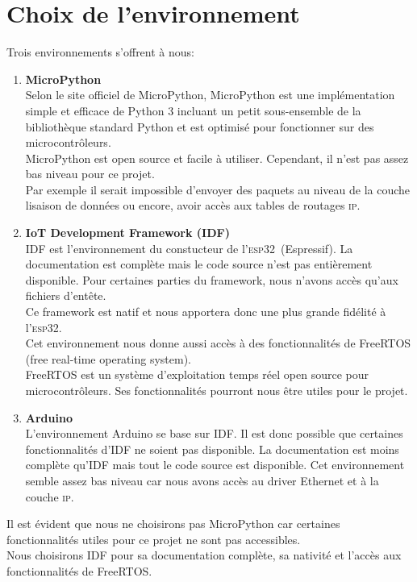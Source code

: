 \documentclass[a4paper, 12pt]{report}
\newcommand{\esp}{\textsc{esp32}}
\begin{document}
\section{Choix de l'environnement}
    Trois environnements s'offrent à nous:
    \begin{enumerate}
        \item \textbf{MicroPython}\\
            Selon le site officiel de MicroPython\cite{micropython_w}, MicroPython est une implémentation simple et efficace de Python 3
            incluant un petit sous-ensemble de la bibliothèque standard Python et est optimisé pour fonctionner sur des microcontrôleurs.\\
            MicroPython est open source et facile à utiliser. Cependant, il n'est pas assez bas niveau pour ce projet.\\
            Par exemple il serait impossible d'envoyer des paquets au niveau de la couche lisaison de données ou encore, avoir accès aux tables de routages \textsc{ip}.\\
        
        \item \textbf{IoT Development Framework (IDF)}\\
            IDF est l'environnement du constucteur de l'\esp\ (Espressif). La documentation est complète mais le code source n'est pas entièrement disponible. Pour certaines
            parties du framework, nous n'avons accès qu'aux fichiers d'entête.\\
            Ce framework est natif et nous apportera donc une plus grande fidélité à l'\esp. \\
            Cet environnement nous donne aussi accès à des fonctionnalités de FreeRTOS (free real-time operating system).\\
            FreeRTOS est un système d'exploitation temps réel open source pour microcontrôleurs. Ses fonctionnalités pourront nous être utiles pour le projet.\\

        \item \textbf{Arduino}\\
            L'environnement Arduino se base sur IDF. Il est donc possible que certaines fonctionnalités d'IDF ne soient pas disponible. 
            La documentation est moins complète qu'IDF mais tout le code source est disponible. Cet environnement semble assez bas
            niveau car nous avons accès au driver Ethernet et à la couche \textsc{ip}.
    \end{enumerate}
    \vspace{1cm}
    Il est évident que nous ne choisirons pas MicroPython car certaines fonctionnalités utiles pour ce projet ne sont pas accessibles.\\
    Nous choisirons IDF pour sa documentation complète, sa nativité et l'accès aux fonctionnalités de FreeRTOS.
\end{document}
